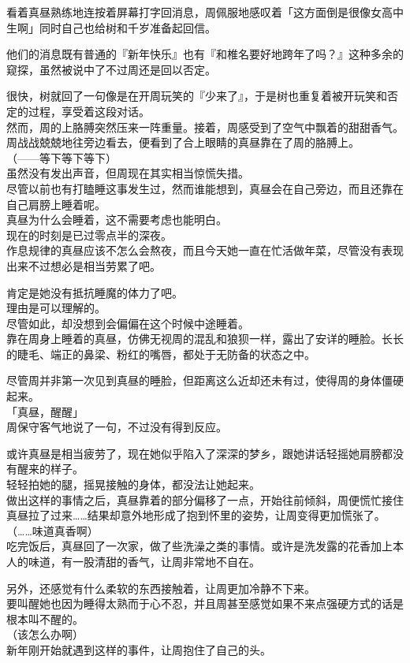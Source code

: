 看着真昼熟练地连按着屏幕打字回消息，周佩服地感叹着「这方面倒是很像女高中生啊」同时自己也给树和千岁准备起回信。

他们的消息既有普通的『新年快乐』也有『和椎名要好地跨年了吗？』这种多余的窥探，虽然被说中了不过周还是回以否定。

很快，树就回了一句像是在开周玩笑的『少来了』，于是树也重复着被开玩笑和否定的过程，享受着这段对话。\\

然而，周的上胳膊突然压来一阵重量。接着，周感受到了空气中飘着的甜甜香气。\\

周战战兢兢地往旁边看去，便看到了合上眼睛的真昼靠在了周的胳膊上。\\

（——等下等下等下）\\

虽然没有发出声音，但周现在其实相当惊慌失措。\\

尽管以前也有打瞌睡这事发生过，然而谁能想到，真昼会在自己旁边，而且还靠在自己肩膀上睡着呢。\\

真昼为什么会睡着，这不需要考虑也能明白。\\

现在的时刻是已过零点半的深夜。\\

作息规律的真昼应该不怎么会熬夜，而且今天她一直在忙活做年菜，尽管没有表现出来不过想必是相当劳累了吧。

肯定是她没有抵抗睡魔的体力了吧。\\

理由是可以理解的。\\

尽管如此，却没想到会偏偏在这个时候中途睡着。\\

靠在周身上睡着的真昼，仿佛无视周的混乱和狼狈一样，露出了安详的睡脸。长长的睫毛、端正的鼻梁、粉红的嘴唇，都处于无防备的状态之中。

尽管周并非第一次见到真昼的睡脸，但距离这么近却还未有过，使得周的身体僵硬起来。\\

「真昼，醒醒」\\

周保守客气地说了一句，不过没有得到反应。

或许真昼是相当疲劳了，现在她似乎陷入了深深的梦乡，跟她讲话轻摇她肩膀都没有醒来的样子。\\

轻轻拍她的腿，摇晃接触的身体，都没法让她起来。\\

做出这样的事情之后，真昼靠着的部分偏移了一点，开始往前倾斜，周便慌忙接住真昼拉了过来……结果却意外地形成了抱到怀里的姿势，让周变得更加慌张了。\\

（……味道真香啊）\\

吃完饭后，真昼回了一次家，做了些洗澡之类的事情。或许是洗发露的花香加上本人的味道，有一股清甜的香气，让周非常地不自在。

另外，还感觉有什么柔软的东西接触着，让周更加冷静不下来。\\

要叫醒她也因为睡得太熟而于心不忍，并且周甚至感觉如果不来点强硬方式的话是根本叫不醒的。\\

（该怎么办啊）\\

新年刚开始就遇到这样的事件，让周抱住了自己的头。
